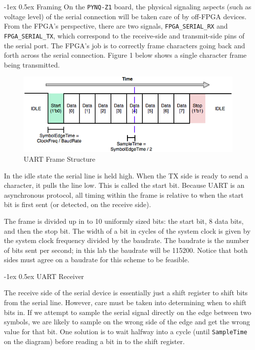 \documentclass[11pt]{article}
\makeatletter
\renewcommand{\subsection}
{\@startsection {subsection}{1}{0pt}
 {-1ex}
 {0.5ex}
 {\bfseries\normalsize}}
\makeatother
\begin{document}
\subsection{Framing}
On the \verb|PYNQ-Z1| board, the physical signaling aspects (such as voltage level) of the serial connection will be taken care of by off-FPGA devices.
From the FPGA's perspective, there are two signals, \verb|FPGA_SERIAL_RX| and \verb|FPGA_SERIAL_TX|, which correspond to the receive-side and transmit-side pins of the serial port.
The FPGA's job is to correctly frame characters going back and forth across the serial connection.
Figure 1 below shows a single character frame being transmitted.

\begin{figure}[H]
  \centerline{\includegraphics[width=6in]{figs/uart_frame.png}}
  \caption{UART Frame Structure}
\end{figure}

In the idle state the serial line is held high.
When the TX side is ready to send a character, it pulls the line low.
This is called the start bit.
Because UART is an asynchronous protocol, all timing within the frame is relative to when the start bit is first sent (or detected, on the receive side).

The frame is divided up in to 10 uniformly sized bits: the start bit, 8 data bits, and then the stop bit.
The width of a bit in cycles of the system clock is given by the system clock frequency divided by the baudrate.
The baudrate is the number of bits sent per second; in this lab the baudrate will be 115200.
Notice that both sides must agree on a baudrate for this scheme to be feasible.

\subsection{UART Receiver}

The receive side of the serial device is essentially just a shift register to shift bits from the serial line.
However, care must be taken into determining when to shift bits in.
If we attempt to sample the serial signal directly on the edge between two symbols, we are likely to sample on the wrong side of the edge and get the wrong value for that bit.
One solution is to wait halfway into a cycle (until \verb|SampleTime| on the diagram) before reading a bit in to the shift register.
\end{document}
